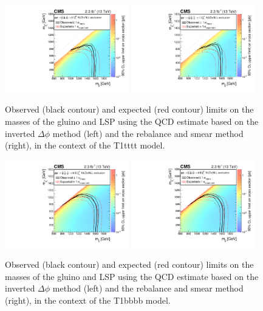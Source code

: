 \begin{figure}[tb!]
\centering
    \includegraphics[width=0.48\textwidth]{figures/SusySearches/Ra2b2015/SMSttttXSEC.pdf}
    \includegraphics[width=0.48\textwidth]{figures/SusySearches/Ra2b2015/SMSttttXSEC_rps.pdf} \\
    \caption{Observed (black contour) and expected (red contour) limits on the masses of the gluino and LSP using the QCD estimate based on the inverted $\Delta\phi$ method (left) and the rebalance and smear method (right), in the context of the T1tttt model.}
    \label{fig:limitsT1tttt}
\end{figure}
\begin{figure}[tb!]
\centering
    \includegraphics[width=0.48\textwidth]{figures/SusySearches/Ra2b2015/SMSbbbbXSEC.pdf}
    \includegraphics[width=0.48\textwidth]{figures/SusySearches/Ra2b2015/SMSbbbbXSEC_rps.pdf} \\
    \caption{Observed (black contour) and expected (red contour) limits on the masses of the gluino and LSP using the QCD estimate based on the inverted $\Delta\phi$ method (left) and the rebalance and smear method (right), in the context of the T1bbbb model.}
    \label{fig:limitsT1bbbb}
\end{figure}

